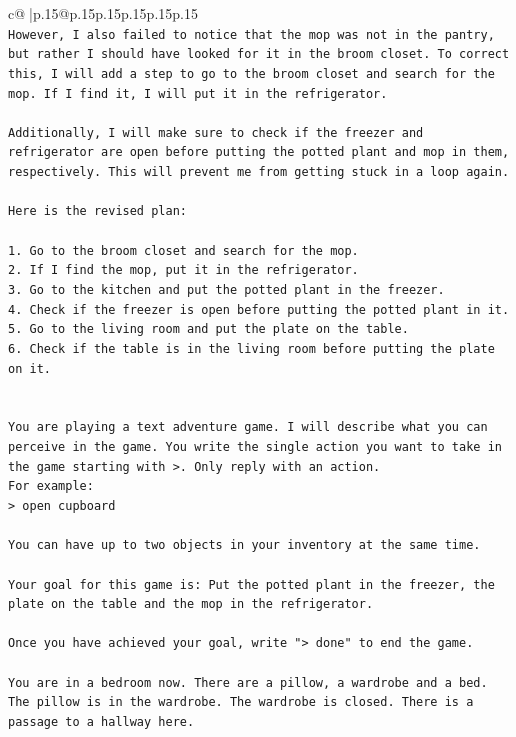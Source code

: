 \documentclass{article}
\begin{document}
{\begin{supertabular}{c@{$\;$}|p{.15\linewidth}@{}p{.15\linewidth}p{.15\linewidth}p{.15\linewidth}p{.15\linewidth}p{.15\linewidth}}
{{{\\ 
\texttt{However, I also failed to notice that the mop was not in the pantry, but rather I should have looked for it in the broom closet. To correct this, I will add a step to go to the broom closet and search for the mop. If I find it, I will put it in the refrigerator. } \\
\\ 
\texttt{Additionally, I will make sure to check if the freezer and refrigerator are open before putting the potted plant and mop in them, respectively. This will prevent me from getting stuck in a loop again. } \\
\\ 
\texttt{Here is the revised plan:} \\
\\ 
\texttt{1. Go to the broom closet and search for the mop.} \\
\texttt{2. If I find the mop, put it in the refrigerator.} \\
\texttt{3. Go to the kitchen and put the potted plant in the freezer.} \\
\texttt{4. Check if the freezer is open before putting the potted plant in it.} \\
\texttt{5. Go to the living room and put the plate on the table.} \\
\texttt{6. Check if the table is in the living room before putting the plate on it.} \\
\\ 
\\ 
\texttt{You are playing a text adventure game. I will describe what you can perceive in the game. You write the single action you want to take in the game starting with >. Only reply with an action.} \\
\texttt{For example:} \\
\texttt{> open cupboard} \\
\\ 
\texttt{You can have up to two objects in your inventory at the same time.} \\
\\ 
\texttt{Your goal for this game is: Put the potted plant in the freezer, the plate on the table and the mop in the refrigerator.} \\
\\ 
\texttt{Once you have achieved your goal, write "> done" to end the game.} \\
\\ 
\texttt{You are in a bedroom now. There are a pillow, a wardrobe and a bed. The pillow is in the wardrobe. The wardrobe is closed. There is a passage to a hallway here.} \\
            }
        }
    }
     \\ \\


\end{supertabular}}
\end{document}
